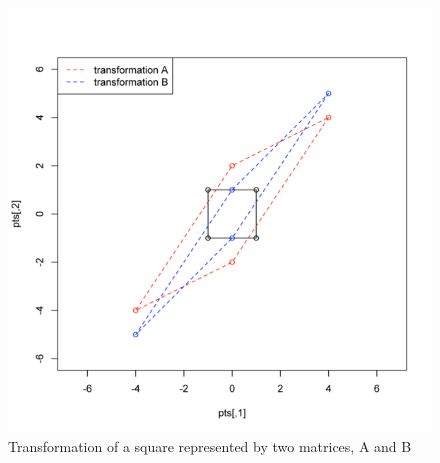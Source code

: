 \begin{figure}[htbp]
\centering
\includegraphics{eigen-transform.png}
\caption{Transformation of a square represented by two matrices, A and
B}
\end{figure}

